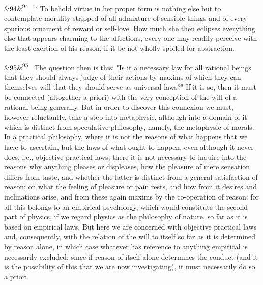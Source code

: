 \documentclass[12pt]{article}
\newcommand{\para}[1][]{\par\noindent\ifx&#1&\else\textsuperscript{\footnotesize #1}~\fi}
\begin{document}
\para[94] * To behold virtue in her proper form is nothing else but to contemplate morality stripped of all admixture of sensible things and of every spurious ornament of reward or self-love. How much she then eclipses everything else that appears charming to the affections, every one may readily perceive with the least exertion of his reason, if it be not wholly spoiled for abstraction.

\para[95] The question then is this: "Is it a necessary law for all rational beings that they should always judge of their actions by maxims of which they can themselves will that they should serve as universal laws?" If it is so, then it must be connected (altogether a priori) with the very conception of the will of a rational being generally. But in order to discover this connexion we must, however reluctantly, take a step into metaphysic, although into a domain of it which is distinct from speculative philosophy, namely, the metaphysic of morals. In a practical philosophy, where it is not the reasons of what happens that we have to ascertain, but the laws of what ought to happen, even although it never does, i.e., objective practical laws, there it is not necessary to inquire into the reasons why anything pleases or displeases, how the pleasure of mere sensation differs from taste, and whether the latter is distinct from a general satisfaction of reason; on what the feeling of pleasure or pain rests, and how from it desires and inclinations arise, and from these again maxims by the co-operation of reason: for all this belongs to an empirical psychology, which would constitute the second part of physics, if we regard physics as the philosophy of nature, so far as it is based on empirical laws. But here we are concerned with objective practical laws and, consequently, with the relation of the will to itself so far as it is determined by reason alone, in which case whatever has reference to anything empirical is necessarily excluded; since if reason of itself alone determines the conduct (and it is the possibility of this that we are now investigating), it must necessarily do so a priori.
\end{document}
